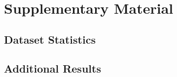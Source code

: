 
\appendix
\chapter{Supplementary Material}
\label{app:A}


\section{Dataset Statistics}

\section{Additional Results}
